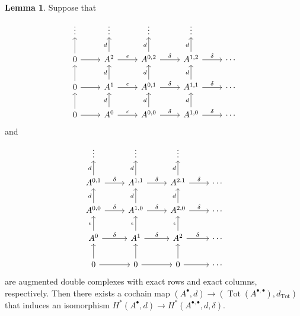 \documentclass[10pt,letterpaper,cm]{nupset}
\theoremstyle{definition}
\theoremstyle{theorem}
\newtheorem{lemma}[definition]{Lemma}
\theoremstyle{remark}
\newcommand{\1}{\mathbb{1}}
\newcommand{\0}{\vec 0}
\DeclareMathOperator{\tot}{Tot}
\begin{document}
\begin{lemma}
Suppose that
\[
\begin{tikzcd}
\vdots                & \vdots                                   & \vdots                                       & \vdots                                       &        \\
0 \arrow[r] \arrow[u] & A^2 \arrow[r, "\epsilon"] \arrow[u, "d"] & {A^{0,2}} \arrow[r, "\delta"] \arrow[u, "d"] & {A^{1,2}} \arrow[r, "\delta"] \arrow[u, "d"] & \cdots \\
0 \arrow[r] \arrow[u] & A^1 \arrow[r, "\epsilon"] \arrow[u, "d"] & {A^{0,1}} \arrow[r, "\delta"] \arrow[u, "d"] & {A^{1,1}} \arrow[r, "\delta"] \arrow[u, "d"] & \cdots \\
0 \arrow[r] \arrow[u] & A^0 \arrow[r, "\epsilon"] \arrow[u, "d"] & {A^{0,0}} \arrow[r, "\delta"] \arrow[u, "d"] & {A^{1,0}} \arrow[r, "\delta"] \arrow[u, "d"] & \cdots
\end{tikzcd}
\] and 
\[
\begin{tikzcd}
\vdots                                        & \vdots                                        & \vdots                                        &        \\
{A^{0,1}} \arrow[r, "\delta"] \arrow[u, "d"]  & {A^{1,1}} \arrow[r, "\delta"] \arrow[u, "d"]  & A^{2.1} \arrow[u, "d"] \arrow[r, "\delta"]    & \cdots \\
{A^{0,0}} \arrow[r, "\delta"] \arrow[u, "d"]  & {A^{1,0}} \arrow[r, "\delta"] \arrow[u, "d"]  & {A^{2,0}} \arrow[u, "d"] \arrow[r, "\delta"]  & \cdots \\
A^0 \arrow[u, "\epsilon"] \arrow[r, "\delta"] & A^1 \arrow[u, "\epsilon"] \arrow[r, "\delta"] & A^2 \arrow[u, "\epsilon"] \arrow[r, "\delta"] & \cdots \\
0 \arrow[u] \arrow[r]                         & 0 \arrow[u] \arrow[r]                         & 0 \arrow[u] \arrow[r]               & \cdots
\end{tikzcd}
\]
are augmented double complexes with exact rows  and exact columns, respectively. Then there exists a cochain map $(A^{\bullet}, d) \to (\tot(A^{\bullet, \bullet}), d_{\tot})$ that induces an isomorphism $H^{\ast}(A^{\bullet}, d) \to H^{\ast}(A^{\bullet, \bullet}, d, \delta).$
\end{lemma}
\end{document}
